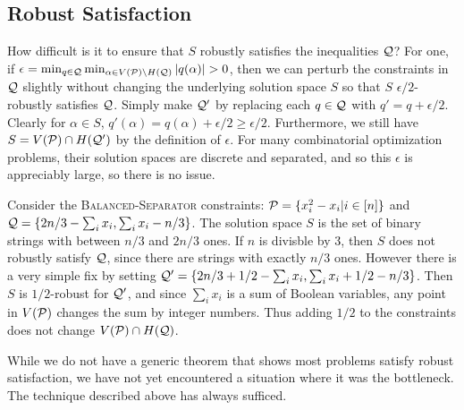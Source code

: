 \subsection{Robust Satisfaction}
How difficult is it to ensure that $S$ robustly satisfies the inequalities $\mathcal Q$? For one, if $\epsilon = \min_{q \in \mathcal Q} \min_{\alpha \in V(\mathcal P) \setminus H(\mathcal Q)} |q(\alpha)| > 0$, then we can perturb the constraints in $\mathcal Q$ slightly without changing the underlying solution space $S$ so that $S$ $\epsilon/2$-robustly satisfies $\mathcal Q$. Simply make $\mathcal Q'$ by replacing each $q \in \mathcal Q$ with $q' = q + \epsilon/2$. Clearly for $\alpha \in S$, $q'(\alpha) = q(\alpha) + \epsilon/2 \geq \epsilon/2$. Furthermore, we still have $S = V(\mathcal P) \cap H(\mathcal Q')$ by the definition of $\epsilon$. For many combinatorial optimization problems, their solution spaces are discrete and separated, and so this $\epsilon$ is appreciably large, so there is no issue. 
\begin{example}
Consider the \textsc{Balanced-Separator} constraints: $\mathcal P = \{x_i^2 - x_i | i \in [n]\}$ and $\mathcal Q = \{2n/3 - \sum_i x_i, \sum_i x_i - n/3\}$. The solution space $S$ is the set of binary strings with between $n/3$ and $2n/3$ ones. If $n$ is divisble by $3$, then $S$ does not robustly satisfy $\mathcal Q$, since there are strings with exactly $n/3$ ones. However there is a very simple fix by setting $\mathcal Q' = \{2n/3 + 1/2 - \sum_i x_i, \sum_i x_i + 1/2 - n/3\}$. Then $S$ is $1/2$-robust for $\mathcal Q'$, and since $\sum_i x_i$ is a sum of Boolean variables, any point in $V(\mathcal P)$ changes the sum by integer numbers. Thus adding $1/2$ to the constraints does not change $V(\mathcal P) \cap H(\mathcal Q)$.
\end{example}
While we do not have a generic theorem that shows most problems satisfy robust satisfaction, we have not yet encountered a situation where it was the bottleneck. The technique described above has always sufficed.

